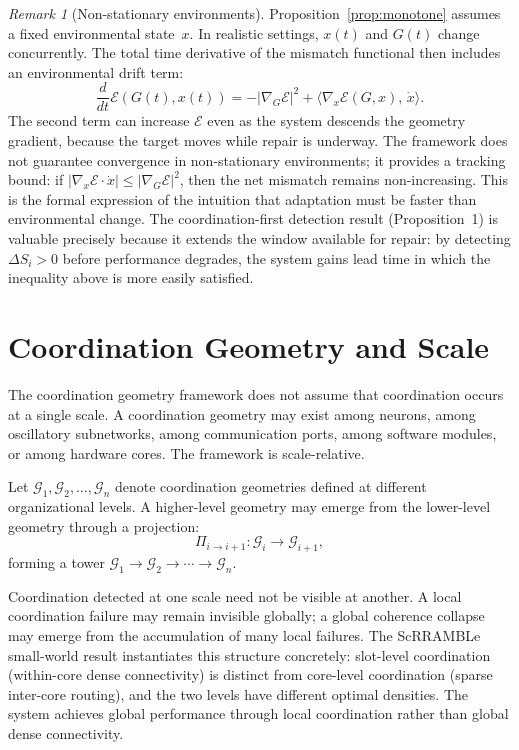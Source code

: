 \documentclass[11pt, a4paper]{article}
\theoremstyle{definition}
\theoremstyle{remark}
\newtheorem{remark}{Remark}
\begin{document}
\begin{remark}[Non-stationary environments]
Proposition~\ref{prop:monotone} assumes a fixed environmental state~$x$.
In realistic settings, $x(t)$ and $G(t)$ change concurrently. The total
time derivative of the mismatch functional then includes an environmental
drift term:
\[
\frac{d}{dt}\mathcal{E}(G(t), x(t))
= -|\nabla_G \mathcal{E}|^2
+ \langle \nabla_x \mathcal{E}(G,x),\, \dot{x} \rangle.
\]
The second term can increase $\mathcal{E}$ even as the system descends the
geometry gradient, because the target moves while repair is underway. The
framework does not guarantee convergence in non-stationary environments;
it provides a tracking bound: if $|\nabla_x \mathcal{E} \cdot \dot{x}| \leq
|\nabla_G \mathcal{E}|^2$, then the net mismatch remains non-increasing.
This is the formal expression of the intuition that adaptation must be
faster than environmental change. The coordination-first detection
result (Proposition~1) is valuable precisely because it extends the window
available for repair: by detecting $\Delta S_i > 0$ before performance
degrades, the system gains lead time in which the inequality above is
more easily satisfied.
\end{remark}

\section{Coordination Geometry and Scale}

The coordination geometry framework does not assume that coordination
occurs at a single scale. A coordination geometry may exist among neurons,
among oscillatory subnetworks, among communication ports, among software
modules, or among hardware cores. The framework is scale-relative.

Let $\mathcal{G}_1, \mathcal{G}_2, \ldots, \mathcal{G}_n$ denote coordination
geometries defined at different organizational levels. A higher-level geometry
may emerge from the lower-level geometry through a projection:
\[
\Pi_{i \to i+1} : \mathcal{G}_i \to \mathcal{G}_{i+1},
\]
forming a tower $\mathcal{G}_1 \to \mathcal{G}_2 \to \cdots \to \mathcal{G}_n$.

Coordination detected at one scale need not be visible at another. A local
coordination failure may remain invisible globally; a global coherence
collapse may emerge from the accumulation of many local failures. The
ScRRAMBLe small-world result instantiates this structure concretely:
slot-level coordination (within-core dense connectivity) is distinct from
core-level coordination (sparse inter-core routing), and the two levels have
different optimal densities. The system achieves global performance through
local coordination rather than global dense connectivity.
\end{document}
